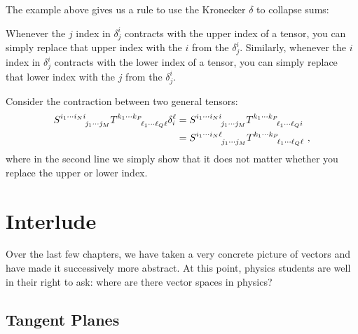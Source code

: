 \documentclass[12pt, oneside]{report}    %
\let\oldsection\section
\def\section{%
  \setcounter{sidenote}{1}%
  \oldsection
}
\begin{document}
\begin{subappendices}
The example above gives us a rule to use the Kronecker $\delta$ to collapse sums:
\begin{newrule}
Whenever the $j$ index in $\delta^i_j$ contracts with the upper index of a tensor, you can simply replace that upper index with the $i$ from the $\delta^i_j$. Similarly, whenever the $i$ index in $\delta^i_j$ contracts with the lower index of a tensor, you can simply replace that lower index with the $j$ from the $\delta^i_j$.
\end{newrule}

\begin{example}
Consider the contraction between two general tensors:
\begin{align}
    S\aij{i_1\cdots i_N i}{j_1\cdots j_M} T\aij{k_1\cdots k_P}{\ell_1\cdots \ell_Q \ell}
    \delta^\ell_i &= 
    S\aij{i_1\cdots i_N i}{j_1\cdots j_M} T\aij{k_1\cdots k_P}{\ell_1\cdots \ell_Q i}
    \\
    &=
    S\aij{i_1\cdots i_N \ell}{j_1\cdots j_M} T\aij{k_1\cdots k_P}{\ell_1\cdots \ell_Q \ell}\ ,
\end{align}
where in the second line we simply show that it does not matter whether you replace the upper or lower index.
\end{example}


\end{subappendices}


\chapter{Interlude}


Over the last few chapters, we have taken a very concrete picture of vectors and have made it successively more abstract. At this point, physics students are well in their right to ask: where are there vector spaces in physics?

\section{Tangent Planes}
\end{document}
